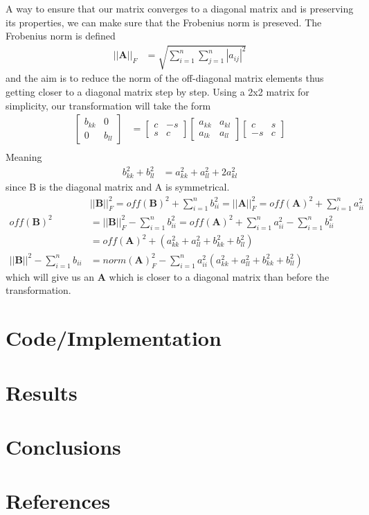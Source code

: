 \documentclass[12pt]{article}
\begin{document}
A way to ensure that our matrix converges to a diagonal matrix and is preserving its properties, we can make sure that the Frobenius norm is preseved. The Frobenius norm is defined
\begin{align*}
    \left|\left|\textbf{A}\right|\right|_F &= \sqrt{\sum_{i=1}^n\sum_{j=1}^n|a_{ij}|^2}
\end{align*}
and the aim is to reduce the norm of the off-diagonal matrix elements thus getting closer to a diagonal matrix step by step. Using a 2x2 matrix for simplicity, our transformation will take the form
\begin{align*}
    \begin{bmatrix}
        b_{kk} & 0\\
        0 & b_{ll}
    \end{bmatrix}&=
    \begin{bmatrix}
        c & -s\\
        s & c
    \end{bmatrix}
    \begin{bmatrix}
        a_{kk} & a_{kl}\\
        a_{lk} & a_{ll}
    \end{bmatrix}
    \begin{bmatrix}
        c & s\\
        -s & c
    \end{bmatrix}\\
\end{align*}
Meaning
\begin{align*}
    b_{kk}^2+b_{ll}^2 &= a_{kk}^2+a_{ll}^2+2a_{kl}^2
\end{align*}
since B is the diagonal matrix and A is symmetrical.
\begin{align*}
    &\boxed{||\textbf{B}||_F^2 = off(\textbf{B})^2+\sum_{i=1}^nb_{ii}^2 =||\textbf{A}||_F^2 = off(\textbf{A})^2+\sum_{i=1}^na_{ii}^2}\\
    off(\textbf{B})^2 &= ||\textbf{B}||_F^2 -\sum_{i=1}^nb_{ii}^2
    = off(\textbf{A})^2 + \sum_{i=1}^na_{ii}^2 -\sum_{i=1}^nb_{ii}^2\\
    &= off(\textbf{A})^2+\left(a_{kk}^2+a_{ll}^2+b_{kk}^2+b_{ll}^2\right)\\
    ||\textbf{B}||^2-\sum_{i=1}^nb_{ii} &= norm(\textbf{A})_F^2-\sum_{i=1}^na_{ii}^2\left(a_{kk}^2+a_{ll}^2+b_{kk}^2+b_{ll}^2\right)
\end{align*}
which will give us an $\textbf{A}$ which is closer to a diagonal matrix than before the transformation.



\section*{Code/Implementation}
\section*{Results}
\section*{Conclusions}
\section*{References}
\end{document}
